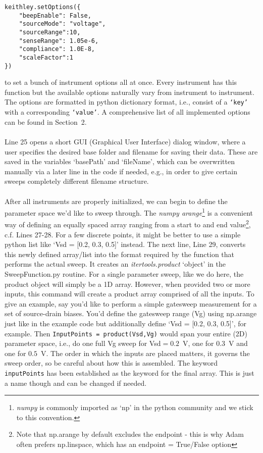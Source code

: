 \begin{verbatim}
keithley.setOptions({
    "beepEnable": False,
    "sourceMode": "voltage",
    "sourceRange":10,
    "senseRange": 1.05e-6,
    "compliance": 1.0E-8,
    "scaleFactor":1
})
\end{verbatim}

to set a bunch of instrument options all at once. Every instrument has this function but the available options naturally vary from instrument to instrument. The options are formatted in python dictionary format, i.e., consist of a \texttt{`key'} with a corresponding \texttt{`value'}. A comprehensive list of all implemented options can be found in Section~2.\\
\\
Line 25 opens a short GUI (Graphical User Interface) dialog window, where a user specifies the desired base folder and filename for saving their data. These are saved in the variables `basePath' and `fileName', which can be overwritten manually via a later line in the code if needed, e.g., in order to give certain sweeps completely different filename structure.\\
\\
After all instruments are properly initialized, we can begin to define the parameter space we'd like to sweep through. The \textit{numpy arange}\footnote{\textit{numpy} is commonly imported as `np' in the python community and we stick to this convention.} is a convenient way of defining an equally spaced array ranging from a start to and end value\footnote{Note that np.arange by default excludes the endpoint - this is why Adam often prefers np.linspace, which has an endpoint = True/False option}, c.f. Lines 27-28. For a few discrete points, it might be better to use a simple python list like `Vsd = [0.2, 0.3, 0.5]' instead. The next line, Line 29, converts this newly defined array/list into the format required by the function that performs the actual sweep. It creates an \textit{itertools.product} `object' in the SweepFunction.py routine. For a single parameter sweep, like we do here, the product object will simply be a 1D array. However, when provided two or more inputs, this command will create a product array comprised of all the inputs. To give an example, say you'd like to perform a simple gatesweep measurement for a set of source-drain biases. You'd define the gatesweep range (Vg) using np.arange just like in the example code but additionally define `Vsd = [0.2, 0.3, 0.5]', for example. Then \texttt{InputPoints = product(Vsd,Vg)} would span your entire (2D) parameter space, i.e., do one full Vg sweep for Vsd$ = 0.2$~V, one for $0.3$~V and one for $0.5$~V. The order in which the inputs are placed matters, it governs the sweep order, so be careful about how this is assembled. The keyword \texttt{inputPoints} has been established as the keyword for the final array. This is just a name though and can be changed if needed.\\

